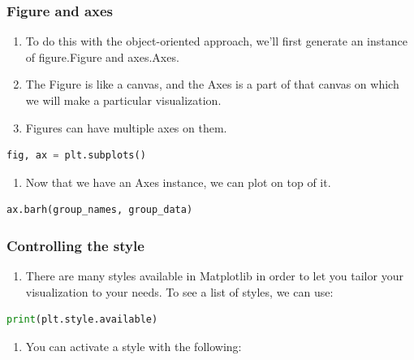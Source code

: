 \documentclass[UTF8,a4paper,12pt]{ctexart}  %
\providecommand{\tightlist}{\setlength{\itemsep}{0pt}\setlength{\parskip}{0pt}}
\begin{document}
\hypertarget{figure-and-axes}{%
\subsubsection{Figure and axes}\label{figure-and-axes}}

\begin{enumerate}
\def\labelenumi{\arabic{enumi}.}
\tightlist
\item
  To do this with the object-oriented approach, we'll first generate
  an instance of figure.Figure and axes.Axes.
\item
  The Figure is like a canvas, and the Axes is a part of that canvas
  on which we will make a particular visualization.
\item
  Figures can have multiple axes on them.
\end{enumerate}

\begin{lstlisting}[language=Python]
fig, ax = plt.subplots()
\end{lstlisting}

\begin{enumerate}
\def\labelenumi{\arabic{enumi}.}
\tightlist
\item
  Now that we have an Axes instance, we can plot on top of it.
\end{enumerate}

\begin{lstlisting}[language=Python]
ax.barh(group_names, group_data)
\end{lstlisting}

\hypertarget{controlling-the-style}{%
\subsubsection{Controlling the style}\label{controlling-the-style}}

\begin{enumerate}
\def\labelenumi{\arabic{enumi}.}
\tightlist
\item
  There are many styles available in Matplotlib in order to let you
  tailor your visualization to your needs. To see a list of styles, we
  can use:
\end{enumerate}

\begin{lstlisting}[language=Python]
print(plt.style.available)
\end{lstlisting}

\begin{enumerate}
\def\labelenumi{\arabic{enumi}.}
\tightlist
\item
  You can activate a style with the following:
\end{enumerate}
\end{document}
